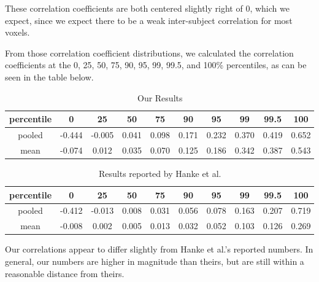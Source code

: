 \documentclass[11pt]{article}
\begin{document}
These correlation coefficients are both centered slightly right of
0, which we expect, since we expect there to be a weak inter-subject
correlation for most voxels.

From those correlation coefficient distributions, we calculated the 
correlation coefficients at the 0, 25, 50, 75, 90, 95, 99, 99.5, and 100\%
percentiles, as can be seen in the table below.
\begin{table}[H]
  \centering
  \caption{Our Results}
  \label{tab:table1}
  \begin{tabular}{cccccccccc}
    percentile & 0 & 25 & 50 & 75 & 90 & 95 & 99 & 99.5 & 100\\
    \hline
    pooled & -0.444 & -0.005 & 0.041 & 0.098 & 0.171 & 0.232 & 0.370 & 0.419 & 0.652\\
    \hline
    mean & -0.074 & 0.012 & 0.035 & 0.070 & 0.125 & 0.186 & 0.342 & 0.387 & 0.543\\
  \end{tabular}
\end{table}

\begin{table}[H]
  \centering
  \caption{Results reported by Hanke et al.}
  \label{tab:table2}
  \begin{tabular}{cccccccccc}
    percentile & 0 & 25 & 50 & 75 & 90 & 95 & 99 & 99.5 & 100\\
    \hline
    pooled & {-0.412} & {-0.013} & 0.008 & 0.031 & 0.056 & 0.078 & 0.163 & 0.207 & 0.719\\
    \hline
    mean & {-0.008} & 0.002 & 0.005 & 0.013 & 0.032 & 0.052 & 0.103 & 0.126 & 0.269\\
  \end{tabular}
\end{table}

Our correlations appear to differ slightly from Hanke et al.'s reported numbers.  In 
general, our numbers are higher in magnitude than theirs, but are still within a reasonable distance from theirs.
\end{document}
